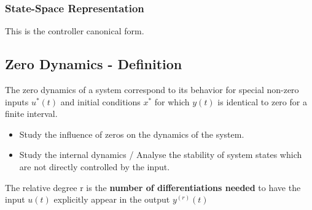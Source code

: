 \documentclass[10pt,a4paper]{scrartcl}
\begin{document}
\begin{multicols*}{3}
\subsubsection{State-Space Representation}


This is the controller canonical form.

\subsection{Zero Dynamics - Definition}

The zero dynamics of a system correspond to its behavior for special non-zero inputs $u^\ast(t)$ and initial conditions $x^\ast$ for which $y(t)$ is identical to zero for a finite interval.

\begin{itemize}
\ncompaq
\item Study the influence of zeros on the dynamics of the system.
\item Study the internal dynamics / Analyse the stability of system states which are not directly controlled by the input.
\end{itemize}

The relative degree r is the \textbf{number of differentiations needed} to have the input $u(t)$ explicitly appear in the output $y^{(r)}(t)$



\end{multicols*}
\end{document}
